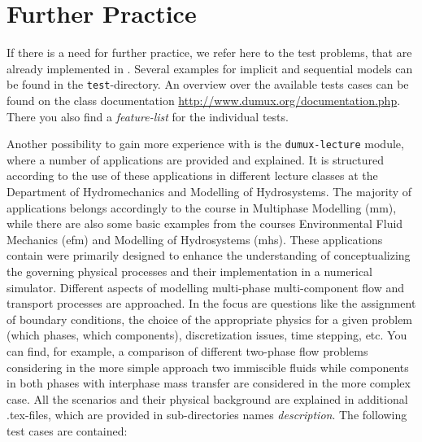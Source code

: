\section{Further Practice}
\label{tutorial-furtherpractice}

If there is a need for further practice, we refer here to the test problems, that
are already implemented in \Dumux. Several examples for implicit and sequential models
can be found in the \texttt{test}-directory. An overview over the available tests
cases can be found on the class documentation \url{http://www.dumux.org/documentation.php}.
There you also find a \emph{feature-list} for the individual tests.

Another possibility to gain more experience with \Dumux is the \texttt{dumux-lecture} module, where 
a number of \Dumux applications are provided and explained. It is structured according to
the use of these applications in different lecture classes at the Department of Hydromechanics and
Modelling of Hydrosystems. The majority of applications belongs accordingly to the 
course in Multiphase Modelling (mm), while there are also some basic examples from the
courses Environmental Fluid Mechanics (efm) and Modelling of Hydrosystems (mhs). 
These applications contain were primarily designed to enhance the understanding of conceptualizing the
governing physical processes and their implementation in a numerical simulator. 
Different aspects of modelling multi-phase multi-component flow and transport processes are approached.
In the focus are questions like the assignment of boundary conditions, the choice of the 
appropriate physics for a given problem (which phases, which components), discretization issues,
time stepping, etc. 
You can find, for example, a comparison of different two-phase flow problems considering in
the more simple approach two immiscible fluids while components in both phases with interphase
mass transfer are considered in the more complex case.
All the scenarios and their physical background are explained in additional .tex-files,
which are provided in sub-directories names \emph{description}. The following test cases are 
contained:
